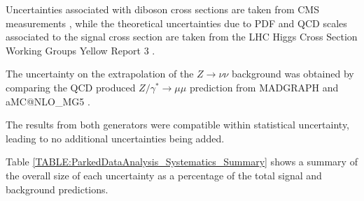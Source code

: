Uncertainties associated with diboson cross sections are taken from \gls{CMS} measurements \cite{ARTICLE:CMSMeasurmentOfWWandZZxsec}, while the theoretical uncertainties due to \gls{PDF} and \gls{QCD} scales associated to the signal cross section are taken from the \gls{LHC} Higgs Cross Section Working Groups Yellow Report 3 \cite{ARTICLE:HandbookofLHCHiggsCrossSectionsInclusiveObservables,ARTICLE:HandbookofLHCHiggsCrossSectionsDifferentialDistributions}.

The uncertainty on the extrapolation of the  $Z\rightarrow\nu\nu$ background was obtained by comparing the \gls{QCD} produced $Z/\gamma^{*}\rightarrow\mu\mu$ prediction from \textsc{MADGRAPH} and a\textsc{MC@NLO\_MG5} \cite{ARTICLE:aMCatNLO}.

The results from both generators were compatible within statistical uncertainty, leading to no additional uncertainties being added. 

Table \ref{TABLE:ParkedDataAnalysis_Systematics_Summary} shows a summary of the overall size of each uncertainty as a percentage of the total signal and background predictions.

